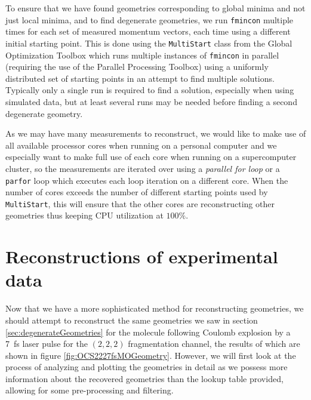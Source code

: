 To ensure that we have found geometries corresponding to global minima and not just local minima, and to find degenerate geometries, we run \texttt{fmincon} multiple times for each set of measured momentum vectors, each time using a different initial starting point. This is done using the \texttt{MultiStart} class from the Global Optimization Toolbox which runs multiple instances of \texttt{fmincon} in parallel (requiring the use of the Parallel Processing Toolbox) using a uniformly distributed set of starting points in an attempt to find multiple solutions. Typically only a single run is required to find a solution, especially when using simulated data, but at least several runs may be needed before finding a second degenerate geometry.

As we may have many measurements to reconstruct, we would like to make use of all available processor cores when running on a personal computer and we especially want to make full use of each core when running on a supercomputer cluster, so the measurements are iterated over using a \emph{parallel for loop} or a \texttt{parfor} loop which executes each loop iteration on a different core. When the number of cores exceeds the number of different starting points used by \texttt{MultiStart}, this will ensure that the other cores are reconstructing other geometries thus keeping CPU utilization at $100\%$.

\section{Reconstructions of experimental data}
Now that we have a more sophisticated method for reconstructing geometries, we should attempt to reconstruct the same geometries we saw in section \ref{sec:degenerateGeometries} for the  molecule following Coulomb explosion by a \SI{7}{\fs} laser pulse for the $(2,2,2)$ fragmentation channel, the results of which are shown in figure \ref{fig:OCS2227fsMOGeometry}. However, we will first look at the process of analyzing and plotting the geometries in detail as we possess more information about the recovered geometries than the lookup table provided, allowing for some pre-processing and filtering.

